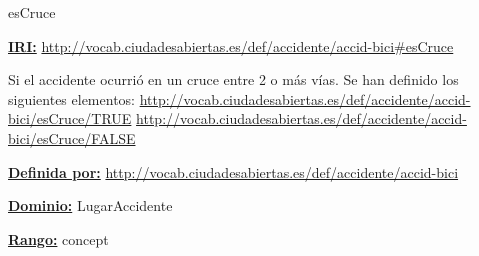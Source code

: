 \begin{mybox}{esCruce}
\begin{flushleft}
\underline{\textbf{IRI:}}
\url{http://vocab.ciudadesabiertas.es/def/accidente/accid-bici#esCruce}
\newline

Si el accidente ocurrió en un cruce entre 2 o más vías. Se han definido los siguientes elementos:
\newline \url{http://vocab.ciudadesabiertas.es/def/accidente/accid-bici/esCruce/TRUE}
\newline \url{http://vocab.ciudadesabiertas.es/def/accidente/accid-bici/esCruce/FALSE}
\newline

\underline{\textbf{Definida por:}}
\url{http://vocab.ciudadesabiertas.es/def/accidente/accid-bici}
\newline

\underline{\textbf{Dominio:}} 
	LugarAccidente
\newline

\underline{\textbf{Rango:}}
	concept

\end{flushleft}
\end{mybox}

































